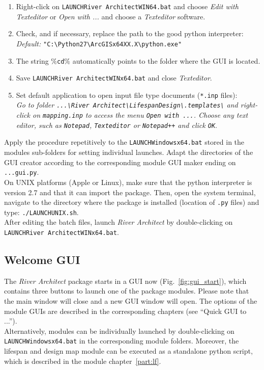 \begin{enumerate}
	\item Right-click on \texttt{LAUNCH{\myUnderscore}River Architect{\myUnderscore}WIN64.bat} and choose \textit{Edit with \textit{Texteditor}} or \textit{Open with ...} and choose a \textit{Texteditor} software.
	\item Check, and if necessary, replace the path to the good python interpreter:\\
	\textit{Default:} \texttt{"C:{\textbackslash}Python27{\textbackslash}ArcGISx64XX.X{\textbackslash}python.exe"}
	\item The string \texttt{$\%$cd$\%$} automatically points to the folder where the GUI is located.
	\item Save \texttt{LAUNCH{\myUnderscore}River Architect{\myUnderscore}WINx64.bat} and close \textit{Texteditor}.
	\item Set default application to open input file type documents (\texttt{*.inp} files):\\
	\textit{Go to folder \texttt{...{\textbackslash}River Architect{\textbackslash}LifespanDesign{\textbackslash}.templates{\textbackslash}} and right-click on \texttt{mapping.inp} to access the menu \texttt{Open with ...}. Choose any text editor, such as \texttt{Notepad}, \texttt{Texteditor} or \texttt{Notepad++} and click \texttt{OK}}.
\end{enumerate}

Apply the procedure repetitively to the \texttt{LAUNCH{\myUnderscore}Windows{\myUnderscore}x64.bat} stored in the modules sub-folders for setting individual launches. Adapt the directories of the GUI creator according to the corresponding module GUI maker ending on \texttt{...{\myUnderscore}gui.py}.\\
On UNIX platforms (Apple or Linux), make sure that the python interpreter is version 2.7 and that it can import the  package. Then, open the system terminal, navigate to the directory where the package is installed (location of \texttt{.py} files) and type: \texttt{./LAUNCH{\myUnderscore}UNIX.sh}.\\

After editing the batch files, launch \textit{River Architect} by double-clicking on\\ \texttt{LAUNCH{\myUnderscore}River Architect{\myUnderscore}WINx64.bat}.

\subsection{Welcome GUI}
The \textit{River Architect} package starts in a GUI now (Fig.~\ref{fig:gui_start}), which contains three buttons to launch one of the package modules. Please note that the main window will close and a new GUI window will open. The options of the module GUIs are described in the corresponding chapters (see ``Quick GUI to ...'').\\
Alternatively, modules can be individually launched by double-clicking on \texttt{LAUNCH{\myUnderscore}Windows{\myUnderscore}x64.bat} in the corresponding module folders. Moreover, the lifespan and design map module can be executed as a standalone python script, which is described in the module chapter~\ref{part:lf}.

